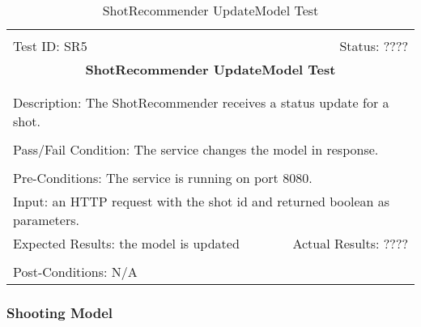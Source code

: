 \documentclass[11pt]{article}
\begin{document}
\begin{center}
\begin{table}[H]
\begin{tabular}{|l r|}\hline&\\[-2mm]
	Test ID: SR5	&Status: ????\\[-3mm]
	\multicolumn{2}{|c|}{\textbf{\large{ShotRecommender UpdateModel Test}}}\\&\\\hline&\\[-3mm]
	\multicolumn{2}{|p{\textwidth}|}{Description: The ShotRecommender receives a status update for a shot.}\\[1mm]\hline&\\[-3mm]
	\multicolumn{2}{|p{\textwidth}|}{Pass/Fail Condition: The service changes the model in response.}\\[1mm]\hline&\\[-3mm]
	\multicolumn{2}{|p{\textwidth}|}{Pre-Conditions: The service is running on port 8080.}\\[4mm]
	\multicolumn{2}{|p{\textwidth}|}{Input: an HTTP request with the shot id and returned boolean as parameters.}\\[2mm]\hline
	\multicolumn{1}{|p{0.49\textwidth}}{Expected Results: the model is updated}	&\multicolumn{1}{|p{0.45\textwidth}|}{Actual Results: ????}\\\hline&\\[-3mm]
	\multicolumn{2}{|p{\textwidth}|}{Post-Conditions: N/A}\\\hline
\end{tabular}
\caption{ShotRecommender UpdateModel Test}
\end{table}
\end{center}

\subsubsection{Shooting Model}
\end{document}
